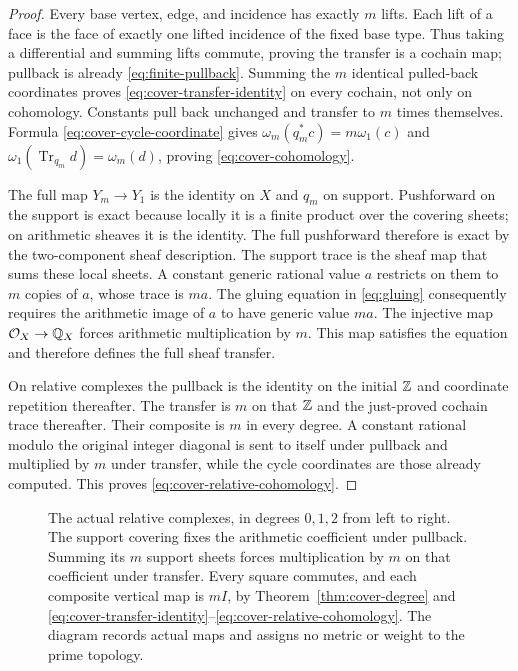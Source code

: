\begin{proof}
Every base vertex, edge, and incidence has exactly $m$ lifts. Each
lift of a face is the face of exactly one lifted incidence of the
fixed base type. Thus taking a differential and summing lifts commute,
proving the transfer is a cochain map; pullback is already
\eqref{eq:finite-pullback}. Summing the $m$ identical pulled-back
coordinates proves \eqref{eq:cover-transfer-identity} on every
cochain, not only on cohomology. Constants pull back unchanged and
transfer to $m$ times themselves. Formula
\eqref{eq:cover-cycle-coordinate} gives
$\omega_m(q_m^*c)=m\omega_1(c)$ and
$\omega_1(\operatorname{Tr}_{q_m}d)=\omega_m(d)$, proving
\eqref{eq:cover-cohomology}.

The full map $Y_m\to Y_1$ is the identity on $X$ and $q_m$ on
support. Pushforward on the support is exact because locally it is
a finite product over the covering sheets; on arithmetic sheaves
it is the identity. The full pushforward therefore is exact by the
two-component sheaf description. The support trace is the sheaf
map that sums these local sheets. A constant generic rational value
$a$ restricts on them to $m$ copies of $a$, whose trace is $ma$.
The gluing equation in \eqref{eq:gluing} consequently requires the
arithmetic image of $a$ to have generic value $ma$. The injective
map $\mathcal O_X\to\mathbb Q_X$ forces arithmetic multiplication by $m$.
This map satisfies the equation and therefore defines the full
sheaf transfer.

On relative complexes the pullback is the identity on the initial
$\mathbb Z$ and coordinate repetition thereafter. The transfer is $m$ on
that $\mathbb Z$ and the just-proved cochain trace thereafter. Their composite
is $m$ in every degree. A constant rational modulo the original
integer diagonal is sent to itself under pullback and multiplied
by $m$ under transfer, while the cycle coordinates are those already
computed. This proves \eqref{eq:cover-relative-cohomology}.
\end{proof}

\begin{figure}[ht]
\centering
{}
\caption{The actual relative complexes, in degrees $0,1,2$ from
left to right. The support covering fixes the arithmetic coefficient
under pullback. Summing its $m$ support sheets forces multiplication
by $m$ on that coefficient under transfer. Every square commutes,
and each composite vertical map is $mI$, by
Theorem~\ref{thm:cover-degree} and
\eqref{eq:cover-transfer-identity}--\eqref{eq:cover-relative-cohomology}.
The diagram records actual maps and assigns no metric or weight to
the prime topology.}
\end{figure}

